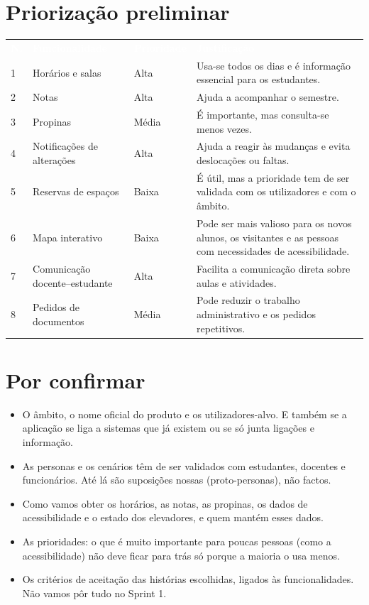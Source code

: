 \documentclass[11pt,a4paper]{article}
\newcommand{\th}[1]{\textcolor{white}{\sffamily\bfseries #1}}
\begin{document}
\section{Priorização preliminar}

\small
\renewcommand{\arraystretch}{1.5}
\begin{tabularx}{\textwidth}{N{0.9cm} L{4.6cm} L{1.9cm} Y}
   \th{N.\textordmasculine} & \th{Funcionalidade} & \th{Prioridade} & \th{Justificação} \\
  1 & Horários e salas & Alta & Usa-se todos os dias e é informação essencial para os estudantes. \\
  2 & Notas & Alta & Ajuda a acompanhar o semestre. \\
  3 & Propinas & Média & É importante, mas consulta-se menos vezes. \\
  4 & Notificações de alterações & Alta & Ajuda a reagir às mudanças e evita deslocações ou faltas. \\
  5 & Reservas de espaços & Baixa & É útil, mas a prioridade tem de ser validada com os utilizadores e com o âmbito. \\
  6 & Mapa interativo & Baixa & Pode ser mais valioso para os novos alunos, os visitantes e as pessoas com necessidades de acessibilidade. \\
  7 & Comunicação docente--estudante & Alta & Facilita a comunicação direta sobre aulas e atividades. \\
  8 & Pedidos de documentos & Média & Pode reduzir o trabalho administrativo e os pedidos repetitivos. \\
  \bottomrule
\end{tabularx}
\renewcommand{\arraystretch}{1}
\normalsize

\section{Por confirmar}

\begin{itemize}
  \item O âmbito, o nome oficial do produto e os utilizadores-alvo. E também se a aplicação se liga a sistemas que já existem ou se só junta ligações e informação.
  \item As personas e os cenários têm de ser validados com estudantes, docentes e funcionários. Até lá são suposições nossas (proto-personas), não factos.
  \item Como vamos obter os horários, as notas, as propinas, os dados de acessibilidade e o estado dos elevadores, e quem mantém esses dados.
  \item As prioridades: o que é muito importante para poucas pessoas (como a acessibilidade) não deve ficar para trás só porque a maioria o usa menos.
  \item Os critérios de aceitação das histórias escolhidas, ligados às funcionalidades. Não vamos pôr tudo no Sprint 1.
\end{itemize}
\end{document}
